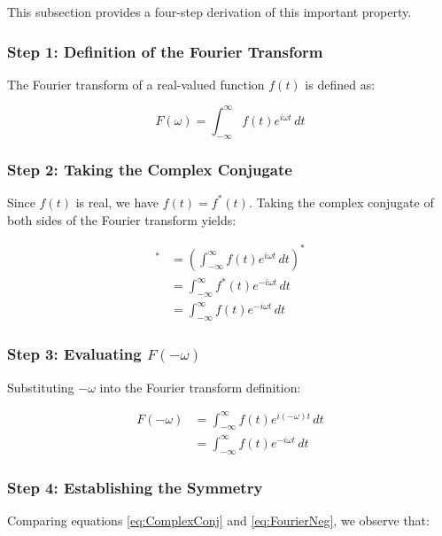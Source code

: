 This subsection provides a four-step derivation of this important property.

\subsubsection*{Step 1: Definition of the Fourier Transform}

The Fourier transform of a real-valued function \( f(t) \) is defined as:

\begin{equation}
F(\omega) = \int_{-\infty}^{\infty} f(t) e^{i \omega t} \, dt \label{eq:FourierDef}
\end{equation}

\subsubsection*{Step 2: Taking the Complex Conjugate}

Since \( f(t) \) is real, we have \( f(t) = f^*(t) \). Taking the complex conjugate of both sides of the Fourier transform yields:

\begin{align}
[F(\omega)]^* &= \left( \int_{-\infty}^{\infty} f(t) e^{i \omega t} \, dt \right)^* \nonumber \\
&= \int_{-\infty}^{\infty} f^*(t) e^{-i \omega t} \, dt \nonumber \\
&= \int_{-\infty}^{\infty} f(t) e^{-i \omega t} \, dt \label{eq:ComplexConj}
\end{align}

\subsubsection*{Step 3: Evaluating \( F(-\omega) \)}

Substituting \( -\omega \) into the Fourier transform definition:

\begin{align}
F(-\omega) &= \int_{-\infty}^{\infty} f(t) e^{i (-\omega) t} \, dt \nonumber \\
&= \int_{-\infty}^{\infty} f(t) e^{-i \omega t} \, dt \label{eq:FourierNeg}
\end{align}

\subsubsection*{Step 4: Establishing the Symmetry}

Comparing equations \eqref{eq:ComplexConj} and \eqref{eq:FourierNeg}, we observe that:

